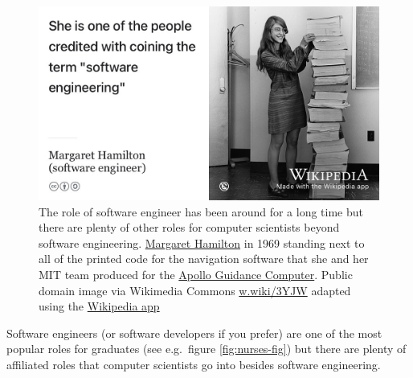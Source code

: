 \documentclass[
]{book}
\begin{document}
\begin{figure}

{\centering \includegraphics[width=1\linewidth]{images/margaret-hamilton} 

}

\caption{The role of software engineer has been around for a long time but there are plenty of other roles for computer scientists beyond software engineering. \href{https://en.wikipedia.org/wiki/Margaret_Hamilton_(software_engineer)}{Margaret Hamilton} in 1969 standing next to all of the printed code for the navigation software that she and her MIT team produced for the \href{https://en.wikipedia.org/wiki/Apollo_Guidance_Computer}{Apollo Guidance Computer}. Public domain image via Wikimedia Commons \href{https://w.wiki/3YJW}{w.wiki/3YJW} adapted using the \href{https://apps.apple.com/us/app/wikipedia/id324715238}{Wikipedia app}}\label{fig:hamilton-fig}
\end{figure}



Software engineers (or software developers if you prefer) are one of the most popular roles for graduates (see e.g.~figure \ref{fig:nurses-fig}) but there are plenty of affiliated roles that computer scientists go into besides software engineering.
\end{document}
